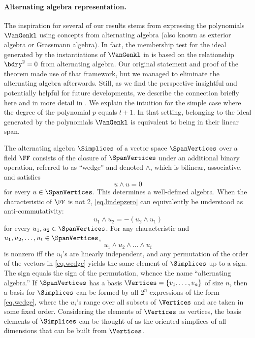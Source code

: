 \documentclass{toc}
\begin{document}
\paragraph{Alternating algebra representation.}
The inspiration for several of our results stems from expressing the
polynomials $\VanGenkl$ using concepts from alternating algebra
(also known as exterior algebra or Grassmann algebra).
In fact, the membership test for the ideal generated by the instantiations of $\VanGenkl$ in  is based on the relationship \(\bdry^2=0\) from alternating algebra.
Our original statement and proof of the theorem made use of that framework,
but we managed to eliminate the alternating algebra afterwards.
Still, as we find the perspective insightful and potentially helpful for
future developments,
we describe the connection briefly here
and in more detail in .
We explain the intuition for the
simple case where the degree of the polynomial $p$ equals $l+1$.
In that setting, belonging to the ideal generated by the polynomials
$\VanGenkl$  is equivalent to being in their linear span.

The alternating algebra $\Simplices$ of a vector space $\SpanVertices$ over a field $\FF$ consists
of the closure of $\SpanVertices$ under an additional binary operation,
referred to as ``wedge'' and denoted $\wedge$,
which is bilinear, associative, and satisfies
\begin{equation}\label{eq.lindepzero}
  u \wedge u = 0
\end{equation}
for every $u \in \SpanVertices$.
This determines a well-defined algebra.
When the characteristic of $\FF$ is not 2,
\eqref{eq.lindepzero} can equivalently be understood as anti-commutativity:
\begin{equation}\label{eq.anti-commute}
  u_1 \wedge u_2 = -(u_2 \wedge u_1)
\end{equation}
for every $u_1, u_2\in \SpanVertices$.
For any characteristic and $u_1, u_2, \dots, u_t \in \SpanVertices$,
\begin{equation} \label{eq.wedge}
  u_1 \wedge u_2 \wedge \dots \wedge u_t
\end{equation}
is nonzero iff the $u_i$'s are linearly independent,
and any permutation of the order of the vectors in \eqref{eq.wedge} yields the
same element of $\Simplices$ up to a sign.
The sign equals the sign of the permutation,
whence the name ``alternating algebra.''
If $\SpanVertices$ has a basis $\Vertices=\{v_1,\dots,v_n\}$ of size $n$,
then a basis for $\Simplices$ can be formed by all $2^n$ expressions of the form
\eqref{eq.wedge},
where the $u_i$'s range over all subsets of $\Vertices$
and are taken in some fixed order.
Considering the elements of $\Vertices$ as vertices,
the basis elements of $\Simplices$ can be thought of as the oriented simplices of all
dimensions that can be built from $\Vertices$.
\end{document}
